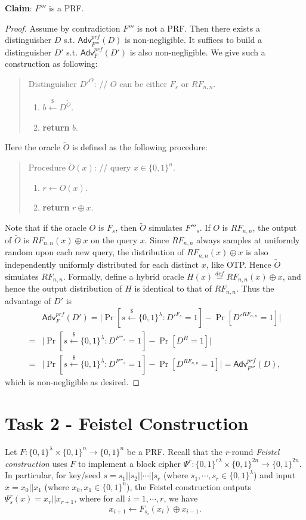 \documentclass[12pt]{article}
\newcommand{\eqdef}{\stackrel{def}{=}}
\newcommand{\bits}{\{0,1\}}
\newcommand{\getsr}{\stackrel{\$}{\gets}}
\newcommand{\Adv}{\textsf{Adv}}
\theoremstyle{definition}
\begin{document}
{\bf Claim}: $F'''$ is a PRF.
\begin{proof}
Assume by contradiction $F'''$ is not a PRF. Then there exists a distinguisher $D$ s.t. $\Adv_{F'''}^{prf}(D)$ is non-negligible. It suffices to build a distinguisher $D'$ s.t. $\Adv_{F}^{prf}(D')$ is also non-negligible. We give such a construction as following:
\begin{quote}
Distinguisher $D'^O$: // $O$ can be either $F_s$ or $RF_{n,n}$.
\begin{enumerate}
\item $b \getsr D^{\widetilde{O}}$.
\item {\bf return} $b$.
\end{enumerate}
\end{quote}
Here the oracle $\widetilde{O}$ is defined as the following procedure:
\begin{quote}
Procedure $\widetilde{O} (x)$: // query $x\in\bits^n$.
\begin{enumerate}
\item $r \gets O(x)$.
\item {\bf return} $r \oplus x$.
\end{enumerate}
\end{quote}
Note that if the oracle $O$ is $F_s$, then $\widetilde{O}$ simulates $F'''_s$. If $O$ is $RF_{n,n}$, the output of $\widetilde{O}$ is $RF_{n,n}(x) \oplus x$ on the query $x$. Since $RF_{n,n}$ always samples at uniformly random upon each new query, the distribution of $RF_{n,n}(x) \oplus x$ is also independently uniformly distributed for each distinct $x$, like OTP. Hence $\widetilde{O}$ simulates $RF_{n,n}$.
Formally, define a hybrid oracle $H(x) \eqdef RF_{n,n}(x) \oplus x$, and hence the output distribution of $H$ is identical to that of $RF_{n,n}$. Thus the advantage of $D'$ is
$$\begin{aligned}
&\Adv_{F}^{prf}(D') = \bigg| \Pr[s \getsr \bits^\lambda : D'^{F_s}=1] - \Pr[D'^{RF_{n,n}}=1] \bigg| \\
=& \bigg| \Pr[s \getsr \bits^\lambda : D^{F'''_s}=1] - \Pr[D^{H}=1] \bigg| \\
=& \bigg| \Pr[s \getsr \bits^\lambda : D^{F'''_s}=1] - \Pr[D^{RF_{n,n}}=1] \bigg| = \Adv_{F'''}^{prf}(D),
\end{aligned}$$
which is non-negligible as desired.
\end{proof}

\section{Task 2 - Feistel Construction}
Let $F : \bits^\lambda \times \bits^n \to \bits^n$ be a PRF. Recall that the $r$-round \emph{Feistel construction} uses $F$ to implement a block cipher $\Psi^r : \bits^{r\lambda} \times \bits^{2n} \to \bits^{2n}$. In particular, for key/seed $s = s_1 || s_2 || \cdots || s_r$ (where $s_1, \cdots, s_r \in \bits^\lambda$) and input $x = x_0 || x_1$ (where $x_0, x_1 \in \bits^n$), the Feistel construction outputs $\Psi_s^r(x) = x_r || x_{r+1}$, where for all $i=1, \cdots, r$, we have
$$x_{i+1} \gets F_{s_i}(x_i) \oplus x_{i-1}.$$
\end{document}
